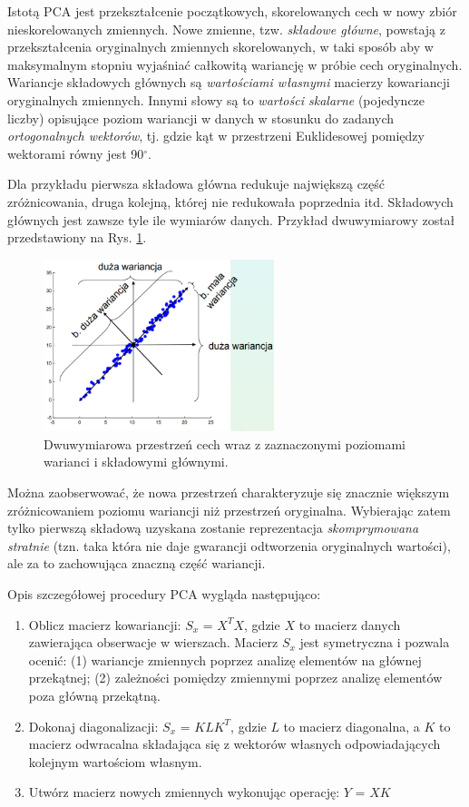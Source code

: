 Istotą PCA jest przekształcenie początkowych, skorelowanych cech w nowy zbiór nieskorelowanych zmiennych. Nowe zmienne, tzw. \textit{składowe główne}, powstają z przekształcenia oryginalnych zmiennych skorelowanych, w taki sposób aby w maksymalnym stopniu wyjaśniać całkowitą wariancję w próbie cech oryginalnych. Wariancje składowych głównych są \textit{wartościami własnymi} macierzy kowariancji oryginalnych zmiennych. Innymi słowy są to \textit{wartości skalarne} (pojedyncze liczby) opisujące poziom wariancji w danych w stosunku do zadanych \textit{ortogonalnych wektorów}, tj. gdzie kąt w przestrzeni Euklidesowej pomiędzy wektorami równy jest 90$^\circ$.

Dla przykładu pierwsza składowa główna redukuje największą część zróżnicowania, druga kolejną, której nie redukowała poprzednia itd. Składowych głównych jest zawsze tyle ile wymiarów danych. Przykład dwuwymiarowy został przedstawiony na Rys. \ref{PCA-2dim}.
\begin{figure}[h!]
	\centering
	\includegraphics[width=0.6\textwidth]{figures/PCA.png}
	\caption{Dwuwymiarowa przestrzeń cech wraz z zaznaczonymi poziomami warianci i składowymi głównymi.}
	\label{PCA-2dim}
\end{figure}
Można zaobserwować, że nowa przestrzeń charakteryzuje się znacznie większym zróżnicowaniem poziomu wariancji niż przestrzeń oryginalna. Wybierając zatem tylko pierwszą składową uzyskana zostanie reprezentacja \textit{skomprymowana stratnie} (tzn. taka która nie daje gwarancji odtworzenia oryginalnych wartości), ale za to zachowująca znaczną część wariancji.

Opis szczegółowej procedury PCA wygląda następująco:
\begin{enumerate}
\item Oblicz macierz kowariancji: $S_x$ = $X^{T}X$, gdzie $X$ to macierz danych zawierająca obserwacje w wierszach. Macierz $S_x$ jest symetryczna i pozwala ocenić: (1) wariancje zmiennych poprzez analizę elementów na głównej przekątnej; (2) zależności pomiędzy zmiennymi poprzez analizę elementów poza główną przekątną. 
\item Dokonaj diagonalizacji: $S_x$ = $KLK^T$, gdzie $L$ to macierz diagonalna, a $K$ to macierz odwracalna składająca się z wektorów własnych odpowiadających kolejnym wartościom własnym.
\item Utwórz macierz nowych zmiennych wykonując operację: $Y$ = $XK$
\end{enumerate}

